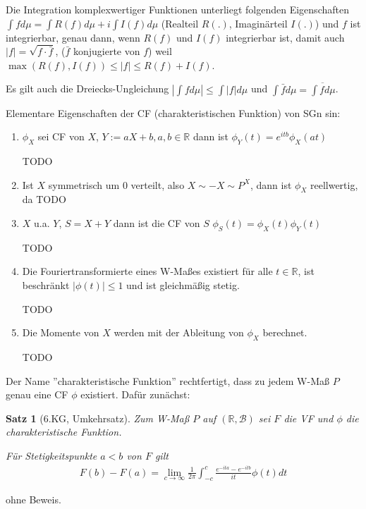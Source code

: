 \documentclass[]{article}
\newtheorem{theorem}{Satz}
\begin{document}
Die Integration komplexwertiger Funktionen unterliegt folgenden Eigenschaften $\int f d\mu = \int R(f) d\mu + i \int I(f) d\mu$ (Realteil $R(.)$, Imaginärteil $I(.)$) und $f$ ist integrierbar, genau dann, wenn $R(f)$ und $I(f)$ integrierbar ist, damit auch $|f|=\sqrt{f\cdot\bar{f}}$, ($\bar{f}$ konjugierte von $f$) weil $\max(R(f), I(f)) \leq |f| \leq R(f) + I(f)$.

Es gilt auch die Dreiecks-Ungleichung $|\int f d\mu | \leq \int |f| d\mu$ und $\int \bar{f} d\mu = \overline{\int f d\mu}$.

Elementare Eigenschaften der CF (charakteristischen Funktion) von SGn sin:
\begin{enumerate}
	\item $\phi_X$ sei CF von $X$, $Y:=aX+b, a,b\in\mathbb{R}$ dann ist $\phi_Y(t)=e^{itb}\phi_X(at)$
	
	TODO
	
	\item Ist $X$ symmetrisch um 0 verteilt, also $X \sim -X \sim P^X$, dann ist $\phi_X$ reellwertig, da TODO
	
	\item $X$ u.a. $Y$, $S=X+Y$ dann ist die CF von $S$ $\phi_S(t)=\phi_X(t)\phi_Y(t)$
	
	TODO
	
	\item Die Fouriertransformierte eines W-Maßes existiert für alle $t\in\mathbb{R}$, ist beschränkt $|\phi(t)|\leq 1$ und ist gleichmäßig stetig.
	
	TODO
	
	\item Die Momente von $X$ werden mit der Ableitung von $\phi_X$ berechnet.
	
	TODO
\end{enumerate}

Der Name ''charakteristische Funktion'' rechtfertigt, dass zu jedem W-Maß $P$ genau eine CF $\phi$ existiert. Dafür zunächst:
\begin{theorem}[6.KG, Umkehrsatz]
	Zum W-Maß $P$ auf $(\mathbb{R}, \mathcal{B})$ sei $F$ die VF und $\phi$ die charakteristische Funktion.
	
	Für Stetigkeitspunkte $a<b$ von $F$ gilt
	\begin{align*}
		F(b)-F(a) = \lim\limits_{c\rightarrow\infty} \frac{1}{2\pi} \int_{-c}^{c} \frac{e^{-ita}-e^{-itb}}{it} \phi(t) dt
	\end{align*}
\end{theorem}

ohne Beweis.
\end{document}
